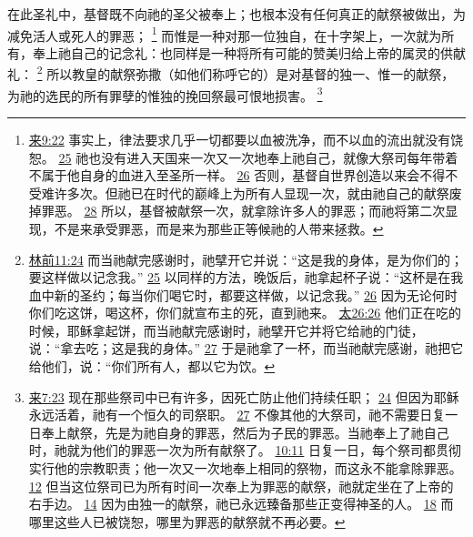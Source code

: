 \documentclass[12pt, a4paper, oneside]{ctexart}
\newcounter{parnum}[section]
\newcommand{\N}{%
   \noindent\refstepcounter{parnum}%
    \makebox[\parindent][l]{\textbf{\arabic{parnum}.}}}
\begin{document}
\N 在此圣礼中，基督既不向祂的圣父被奉上；也根本没有任何真正的献祭被做出，为减免活人或死人的罪恶；
	\footnote {
		\href{https://biblehub.com/hebrews/9-22.htm}{来9:22} 事实上，律法要求几乎一切都要以血被洗净，而不以血的流出就没有饶恕。
		\href{https://biblehub.com/hebrews/9-25.htm}{25} 祂也没有进入天国来一次又一次地奉上祂自己，就像大祭司每年带着不属于他自身的血进入至圣所一样。
		\href{https://biblehub.com/hebrews/9-26.htm}{26} 否则，基督自世界创造以来会不得不受难许多次。但祂已在时代的巅峰上为所有人显现一次，就由祂自己的献祭废掉罪恶。
		\href{https://biblehub.com/hebrews/9-28.htm}{28} 所以，基督被献祭一次，就拿除许多人的罪恶；而祂将第二次显现，不是来承受罪恶，而是来为那些正等候祂的人带来拯救。
	}
	而惟是一种对那一位独自，在十字架上，一次就为所有，奉上祂自己的记念礼：也同样是一种将所有可能的赞美归给上帝的属灵的供献礼：
	\footnote {
		\href{https://biblehub.com/1_corinthians/11-24.htm}{林前11:24} 而当祂献完感谢时，祂擘开它并说：“这是我的身体，是为你们的；要这样做以记念我。”
		\href{https://biblehub.com/1_corinthians/11-25.htm}{25} 以同样的方法，晚饭后，祂拿起杯子说：“这杯是在我血中新的圣约；每当你们喝它时，都要这样做，以记念我。”
		\href{https://biblehub.com/1_corinthians/11-26.htm}{26} 因为无论何时你们吃这饼，喝这杯，你们就宣布主的死，直到祂来。
		\href{https://biblehub.com/matthew/26-26.htm}{太26:26} 他们正在吃的时候，耶稣拿起饼，而当祂献完感谢时，祂擘开它并将它给祂的门徒，说：“拿去吃；这是我的身体。”
		\href{https://biblehub.com/matthew/26-27.htm}{27} 于是祂拿了一杯，而当祂献完感谢，祂把它给他们，说：“你们所有人，都以它为饮。
	}
	所以教皇的献祭弥撒（如他们称呼它的）是对基督的独一、惟一的献祭，为祂的选民的所有罪孽的惟独的挽回祭最可恨地损害。
	\footnote {
		\href{https://biblehub.com/hebrews/7-23.htm}{来7:23} 现在那些祭司中已有许多，因死亡防止他们持续任职；
		\href{https://biblehub.com/hebrews/7-24.htm}{24} 但因为耶稣永远活着，祂有一个恒久的司祭职。
		\href{https://biblehub.com/hebrews/7-27.htm}{27} 不像其他的大祭司，祂不需要日复一日奉上献祭，先是为祂自身的罪恶，然后为子民的罪恶。当祂奉上了祂自己时，祂就为他们的罪恶一次为所有献祭了。
		\href{https://biblehub.com/hebrews/10-11.htm}{10:11} 日复一日，每个祭司都贯彻实行他的宗教职责；他一次又一次地奉上相同的祭物，而这永不能拿除罪恶。
		\href{https://biblehub.com/hebrews/10-12.htm}{12} 但当这位祭司已为所有时间一次奉上为罪恶的献祭，祂就定坐在了上帝的右手边。
		\href{https://biblehub.com/hebrews/10-14.htm}{14} 因为由独一的献祭，祂已永远臻备那些正变得神圣的人。
        \href{https://biblehub.com/hebrews/10-18.htm}{18} 而哪里这些人已被饶恕，哪里为罪恶的献祭就不再必要。
	}
\end{document}
